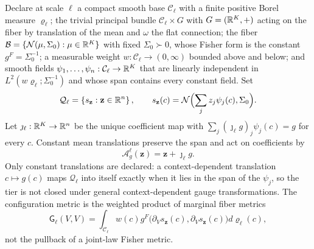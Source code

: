 Declare at scale \(\ell\) a compact smooth base \(\mathcal C_\ell\) with a finite
positive Borel measure \(\varrho_\ell\); the trivial principal bundle
\(\mathcal C_\ell\times G\) with \(G=(\mathbb R^K,+)\) acting on the fiber by
translation of the mean and \(\omega\) the flat connection; the fiber
\(\mathcal B=\{\mathcal N(\mu,\Sigma_0):\mu\in\mathbb R^K\}\) with fixed
\(\Sigma_0\succ0\), whose Fisher form is the constant \(g^F=\Sigma_0^{-1}\); a
measurable weight \(w:\mathcal C_\ell\to(0,\infty)\) bounded above and below; and
smooth fields \(\psi_1,\dots,\psi_n:\mathcal C_\ell\to\mathbb R^K\) that are linearly
independent in \(L^2(w\varrho_\ell;\Sigma_0^{-1})\) and whose span contains every
constant field. Set
\begin{equation}
\mathcal Q_\ell
=\left\{s_{\mathbf z}:\mathbf z\in\mathbb R^n\right\},
\qquad
s_{\mathbf z}(c)
=\mathcal N\Bigl(\sum_jz_j\psi_j(c),\Sigma_0\Bigr).
\label{eq:hist-finite-configuration-tier}
\end{equation}
Let \(\jmath_\ell:\mathbb R^K\to\mathbb R^n\) be the unique coefficient map with
\(\sum_j(\jmath_\ell g)_j\psi_j(c)=g\) for every \(c\). Constant mean
translations preserve the span and act on coefficients by
\begin{equation}
\mathscr A^\ell_g(\mathbf z)=\mathbf z+\jmath_\ell g.
\label{eq:hist-finite-tier-coefficient-action}
\end{equation}
Only constant translations are declared: a context-dependent translation
\(c\mapsto g(c)\) maps \(\mathcal Q_\ell\) into itself exactly when it lies in
the span of the \(\psi_j\), so the tier is not closed under general
context-dependent gauge transformations. The configuration metric is the
weighted product of marginal fiber metrics
\begin{equation}
\mathsf G_\ell(V,V)
=\int_{\mathcal C_\ell}w(c)
g^F\bigl(\partial_Vs_{\mathbf z}(c),\partial_Vs_{\mathbf z}(c)\bigr)
d\varrho_\ell(c),
\label{eq:hist-finite-configuration-metric}
\end{equation}
not the pullback of a joint-law Fisher metric.

